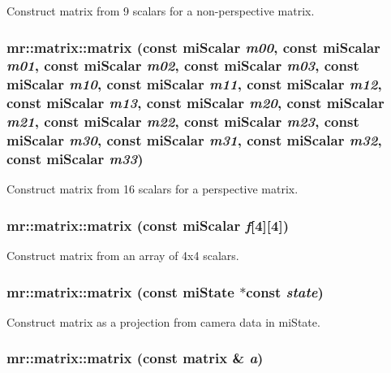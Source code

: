 Construct matrix from 9 scalars for a non-perspective matrix. 

\subsubsection{\setlength{\rightskip}{0pt plus 5cm}mr::matrix::matrix (const mi\-Scalar {\em m00}, const mi\-Scalar {\em m01}, const mi\-Scalar {\em m02}, const mi\-Scalar {\em m03}, const mi\-Scalar {\em m10}, const mi\-Scalar {\em m11}, const mi\-Scalar {\em m12}, const mi\-Scalar {\em m13}, const mi\-Scalar {\em m20}, const mi\-Scalar {\em m21}, const mi\-Scalar {\em m22}, const mi\-Scalar {\em m23}, const mi\-Scalar {\em m30}, const mi\-Scalar {\em m31}, const mi\-Scalar {\em m32}, const mi\-Scalar {\em m33})\hspace{0.3cm}{\tt  [inline]}}\label{classmr_1_1matrix_z19_7}


Construct matrix from 16 scalars for a perspective matrix. 

\subsubsection{\setlength{\rightskip}{0pt plus 5cm}mr::matrix::matrix (const mi\-Scalar {\em f}[4][4])\hspace{0.3cm}{\tt  [inline]}}\label{classmr_1_1matrix_z19_8}


Construct matrix from an array of 4x4 scalars. 

\subsubsection{\setlength{\rightskip}{0pt plus 5cm}mr::matrix::matrix (const mi\-State $\ast$const {\em state})\hspace{0.3cm}{\tt  [inline]}}\label{classmr_1_1matrix_z19_9}


Construct matrix as a projection from camera data in mi\-State. 

\subsubsection{\setlength{\rightskip}{0pt plus 5cm}mr::matrix::matrix (const {\bf matrix} \& {\em a})\hspace{0.3cm}{\tt  [inline]}}\label{classmr_1_1matrix_z19_10}


